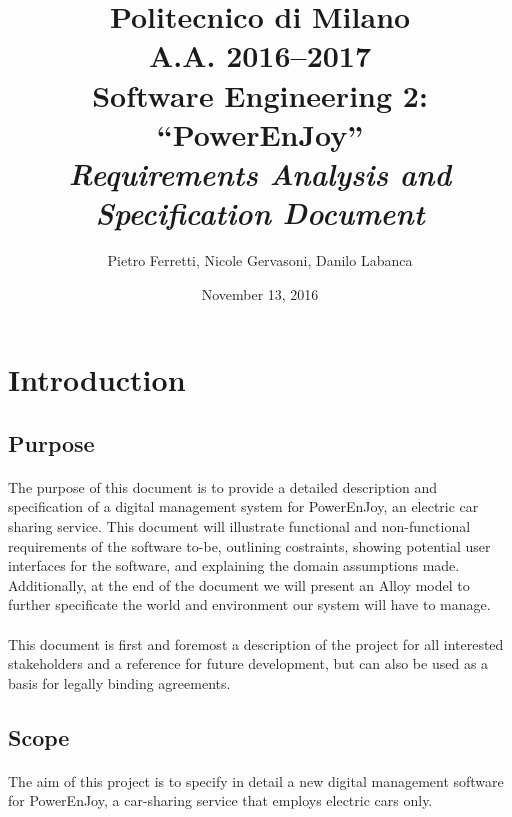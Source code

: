 \documentclass[english]{article}
\begin{document}
\title{Politecnico di Milano\\
 A.A. 2016–2017 \\
Software Engineering 2: “PowerEnJoy” \\
\emph{Requirements Analysis and Specification Document}}

\author{Pietro Ferretti, Nicole Gervasoni, Danilo Labanca}
\date{November 13, 2016}
\maketitle

\newpage

\tableofcontents{}

\newpage

\section{Introduction}

\subsection{Purpose}

\paragraph{}
The purpose of this document is to provide a detailed description and specification of a digital management system for PowerEnJoy, an electric car sharing service. This document will
illustrate functional and non-functional requirements of the software to-be, outlining costraints, showing potential user interfaces for the software, and explaining the domain assumptions made. Additionally, at the end of the document we will present an Alloy model to further specificate the world and environment our system will have to manage.

\paragraph{}
This document is first and foremost a description of the project for all interested stakeholders and a reference for future development, but can also be used as a basis for legally binding agreements.


\subsection{Scope}

\paragraph{}
The aim of this project is to specify in detail a new digital management software for PowerEnJoy, a car-sharing service that employs electric cars only.
\end{document}
